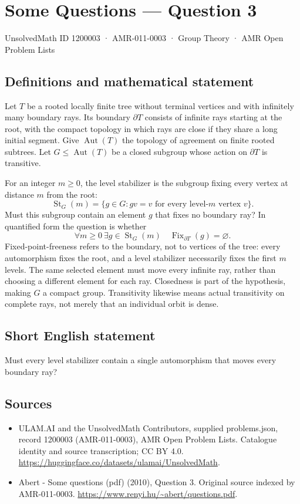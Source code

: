 \documentclass[11pt,a4paper]{article}
\begin{document}
\section*{Some Questions — Question 3}\label{1200003}
{\small UnsolvedMath ID 1200003 · AMR-011-0003 · Group Theory · AMR Open Problem Lists}
\subsection{Definitions and mathematical statement}
Let $T$ be a rooted locally finite tree without terminal vertices and with infinitely many boundary rays. Its boundary $\partial T$ consists of infinite rays starting at the root, with the compact topology in which rays are close if they share a long initial segment. Give $\operatorname{Aut}(T)$ the topology of agreement on finite rooted subtrees. Let $G\leq\operatorname{Aut}(T)$ be a closed subgroup whose action on $\partial T$ is transitive.

For an integer $m\geq0$, the level stabilizer is the subgroup fixing every vertex at distance $m$ from the root:
\[
 \operatorname{St}_G(m)=\{g\in G:gv=v\text{ for every level-}m\text{ vertex }v\}.
\]
Must this subgroup contain an element $g$ that fixes no boundary ray? In quantified form the question is whether
\[
 \forall m\geq0\ \exists g\in\operatorname{St}_G(m)\quad
                  \operatorname{Fix}_{\partial T}(g)=\varnothing.
\]
Fixed-point-freeness refers to the boundary, not to vertices of the tree: every automorphism fixes the root, and a level stabilizer necessarily fixes the first $m$ levels. The same selected element must move every infinite ray, rather than choosing a different element for each ray. Closedness is part of the hypothesis, making $G$ a compact group. Transitivity likewise means actual transitivity on complete rays, not merely that an individual orbit is dense.
\subsection{Short English statement}
Must every level stabilizer contain a single automorphism that moves every boundary ray?
\subsection{Sources}
\begin{itemize}
\item[S1] ULAM.AI and the UnsolvedMath Contributors, supplied problems.json, record 1200003 (AMR-011-0003), AMR Open Problem Lists. Catalogue identity and source transcription; CC BY 4.0.
\url{https://huggingface.co/datasets/ulamai/UnsolvedMath}.
\item[S2] Abert - Some questions (pdf) (2010), Question 3. Original source indexed by AMR-011-0003.
\url{https://www.renyi.hu/~abert/questions.pdf}.
\end{itemize}
\end{document}
